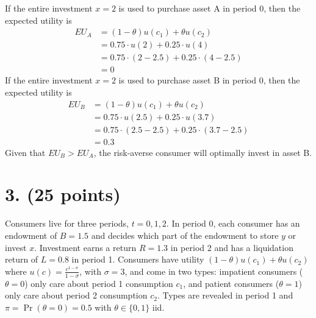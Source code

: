 \documentclass[12pt]{article}
\begin{document}
\begin{enumerate}[label=(\alph*)]
     If the entire investment $x=2$ is used to purchase asset A in period 0, then the expected utility is
    \begin{align*}
        EU_A &= (1 - \theta)u(c_1) + \theta u(c_2)
        \\ &= 0.75 \cdot u(2) + 0.25 \cdot u(4)
        \\ &= 0.75 \cdot  \left(2 - 2.5\right) + 0.25 \cdot \left(4-2.5\right)
        \\ &= 0
    \end{align*}
    If the entire investment $x=2$ is used to purchase asset B in period 0, then the expected utility  is
    \begin{align*}
        EU_B &= (1 - \theta)u(c_1) + \theta u(c_2)
        \\ &= 0.75 \cdot u(2.5) + 0.25 \cdot u(3.7)
        \\ &= 0.75 \cdot  \left(2.5-2.5\right) + 0.25 \cdot \left(3.7-2.5\right)
        \\ &= 0.3
    \end{align*}
    Given that $EU_B > EU_A$,  the risk-averse consumer will optimally invest in asset B.
    
\end{enumerate}

\section*{3. (25 points)}

Consumers live for three periods, $t = 0, 1, 2$. In period 0, each consumer has an endowment of $B = 1.5$ and decides which part of the endowment to store $y$ or invest $x$. Investment earns a return $R = 1.3$ in period 2 and has a liquidation return of $L = 0.8$ in period 1. Consumers have utility $(1-\theta)u(c_1)+\theta u(c_2)$ where $u(c) = \frac{c^{1-\sigma}}{1-\sigma}$, with $\sigma = 3$, and come in two types: impatient consumers ($\theta = 0$) only care about period 1 consumption $c_1$, and patient consumers ($\theta = 1$) only care about period 2 consumption $c_2$. Types are revealed in period 1 and $\pi = \Pr(\theta = 0) = 0.5$ with $\theta \in \{0, 1\}$ iid.
\end{document}
